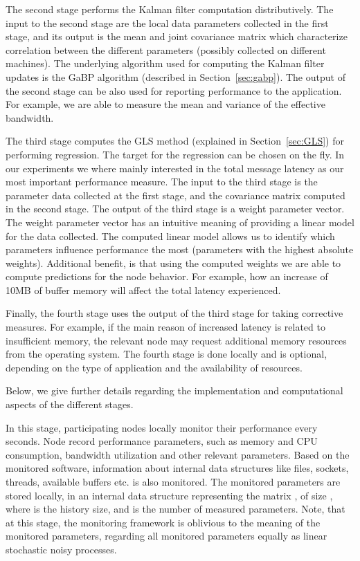 \documentclass[times, 10pt,twocolumn]{article}
\begin{document}
The second stage performs the Kalman filter computation
distributively. The input to the second stage are the
local data parameters collected in the first stage,
and its output is the mean and joint covariance matrix
which characterize correlation between the different parameters (possibly collected on different machines). The underlying algorithm
used for computing the Kalman filter updates is the GaBP algorithm (described in Section~\ref{sec:gabp}).
The output of the second stage can be also used for reporting performance to the application. For example, we
are able to measure the mean and variance of the effective bandwidth.

The third stage computes the GLS method (explained in Section~\ref{sec:GLS}) for performing regression. The target for the regression can be chosen on the fly. In our experiments we where mainly interested in the total message latency as our most important performance measure. The input to the third stage is the parameter data collected at the first stage, and the covariance matrix computed in the second stage. The output of the third stage is a weight parameter vector.
The weight parameter vector has an intuitive meaning of providing a linear model for the data collected. The computed linear model allows us to identify which parameters influence performance the most (parameters with the highest absolute weights). Additional benefit, is that using the computed weights we are able to compute predictions for the node
behavior. For example, how an increase of 10MB of buffer memory will affect the total latency experienced.

Finally, the fourth stage uses the output of the third stage for taking corrective measures. For example, if the
main reason of increased latency is related to insufficient memory, the relevant node may request additional memory resources from the operating system. The fourth stage is done locally and is optional, depending on the type of application and the availability of resources.

Below, we give further details regarding the implementation and computational aspects of the different stages.

In this stage, participating nodes locally monitor their performance every  seconds. Node record performance parameters, such as memory and CPU consumption, bandwidth utilization and other relevant parameters. Based on the monitored software, information about internal data structures
like files, sockets, threads, available buffers etc. is also monitored. The monitored parameters
are stored locally, in an internal data structure representing the matrix , of size , where  is the history
size, and  is the number of measured parameters. Note, that at this stage, the monitoring framework is oblivious to the meaning of the monitored parameters, regarding all monitored parameters equally as linear stochastic noisy processes.
\end{document}
